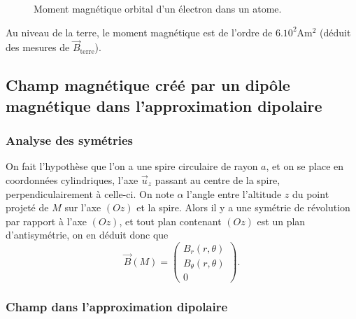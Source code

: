 \begin{figure}
    \centering
    \caption{Moment magnétique orbital d'un électron dans un atome.}    
    \label{fig:moment_magnetique_orbital}
\end{figure}

Au niveau de la terre, le moment magnétique est de l'ordre de $6.10^{2}\si{\ampere\metre\squared}$ (déduit des mesures de $\vec{B}_{\mathrm{terre}}$).

\subsection{Champ magnétique créé par un dipôle magnétique dans l'approximation dipolaire}
\subsubsection{Analyse des symétries}

On fait l'hypothèse que l'on a une spire circulaire de rayon $a$, et on se place en coordonnées cylindriques, l'axe $\vec{u}_z$ passant au centre de la spire, perpendiculairement à celle-ci. On note $\alpha$ l'angle entre l'altitude $z$ du point projeté de $M$ sur l'axe $(Oz)$ et la spire. Alors il y a une symétrie de révolution par rapport à l'axe $(Oz)$, et tout plan contenant $(Oz)$ est un plan d'antisymétrie, on en déduit donc que
\begin{equation}
    \vec{B}(M)=\begin{pmatrix}
        B_{r}(r,\theta)\\ B_{\theta}(r,\theta)\\0
    \end{pmatrix}.
\end{equation}

\subsubsection{Champ dans l'approximation dipolaire}

